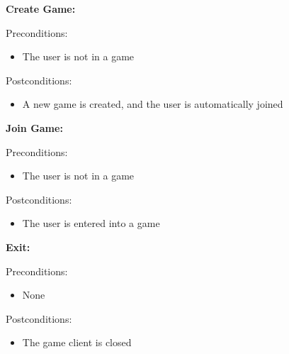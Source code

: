 \documentclass[12pt]{article}
\begin{document}
\begin{description}
\item
\begin{description}
	\item \textbf{Create Game:}
	\item Preconditions:
		\begin{itemize}
		\item The user is not in a game
		\end{itemize}	
	\item Postconditions:
		\begin{itemize}
		\item A new game is created, and the user is automatically joined
		\end{itemize}
\end{description}

\item
\begin{description}
	\item \textbf{Join Game:}
	\item Preconditions:
		\begin{itemize}
		\item The user is not in a game
		\end{itemize}	
	\item Postconditions:
		\begin{itemize}
		\item The user is entered into a game
		\end{itemize}
\end{description}

\item
\begin{description}
	\item \textbf{Exit:}
	\item Preconditions:
		\begin{itemize}
		\item None
		\end{itemize}	
	\item Postconditions:
		\begin{itemize}
		\item The game client is closed
		\end{itemize}
\end{description}


\end{description}
\end{document}
